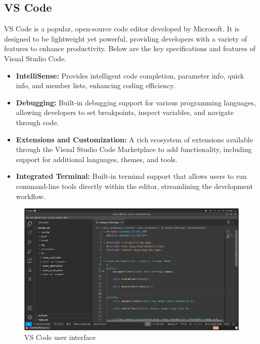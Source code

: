 \subsection{\fontsize{14}{16} VS Code}
{
	\fontsize{12}{14}
	VS Code is a popular, open-source code editor developed by Microsoft. It is designed to be lightweight yet powerful, providing developers with a variety of features to enhance productivity. Below are the key specifications and features of Visual Studio Code.
	\begin{itemize}
		\item \textbf{IntelliSense:} Provides intelligent code completion, parameter info, quick info, and
		member lists, enhancing coding efficiency.
		\item \textbf{Debugging:} Built-in debugging support for various programming languages, allowing
		developers to set breakpoints, inspect variables, and navigate through code.
		\item \textbf{Extensions and Customization:} A rich ecosystem of extensions available through the
		Visual Studio Code Marketplace to add functionality, including support for additional
		languages, themes, and tools.
		\item \textbf{Integrated Terminal:} Built-in terminal support that allows users to run command-line
		tools directly within the editor, streamlining the development workflow.
	\end{itemize}
	
	\begin{figure}[H]
		\centering
		\includegraphics{images/Content/vscodeui}
		\caption{VS Code user interface}
		\label{fig:vscodeui}
	\end{figure}
}